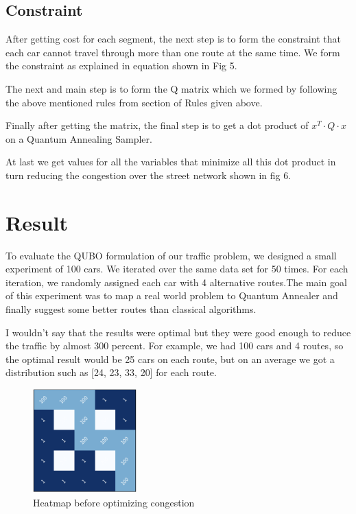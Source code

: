 \documentclass[conference]{IEEEtran}
\begin{document}
\subsection{Constraint}

After getting cost for each segment, the next step is to form the constraint that each car cannot travel through more than one route at the same time. We form the constraint as explained in equation shown in Fig 5.\vspace{6pt}

The next and main step is to form the Q matrix which we formed by following the above mentioned rules from section of Rules given above.\vspace{6pt}

Finally after getting the matrix, the final step is to get a dot product of  \( x^T \cdot Q \cdot x \) on a Quantum Annealing Sampler. \vspace{6pt}

At last we get values for all the variables that minimize all this
dot product in turn reducing the congestion over the street network shown in fig 6.


\section{Result}

To evaluate the QUBO formulation of our traffic problem, we designed a small experiment of 100 cars. We iterated over the same data set for 50 times. For each iteration, we randomly assigned each car with 4 alternative routes.The main goal of this experiment was to map a real world problem to Quantum Annealer and finally suggest some better routes than classical algorithms.\vspace{6pt}

I wouldn’t say that the results were optimal but they were good enough to reduce the traffic by almost 300 percent. For example, we had 100 cars and 4 routes, so the optimal result would be 25 cars on each route, but on an average we got a distribution such as [24, 23, 33, 20] for each route.

\begin{figure}[H]
\centerline{\includegraphics[width=4cm,angle=-45,origin=c]{heatmap1.png}}
\caption{Heatmap before optimizing congestion}
\label{fig}
\end{figure}
\end{document}
